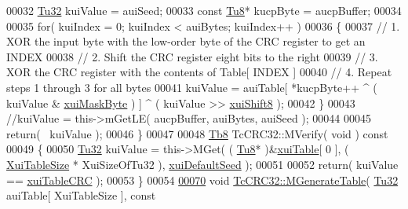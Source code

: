 \begin{DoxyCode}
00032    \mbox{\hyperlink{namespace_g_n_common_a941b527ef318f318aed7903dc832b7e4}{Tu32}}       kuiValue = auiSeed;
00033    \textcolor{keyword}{const} \mbox{\hyperlink{namespace_g_n_common_a7939e251ddbf5d3a31832dcfdc8bde39}{Tu8}}* kucpByte = aucpBuffer;
00034 
00035    \textcolor{keywordflow}{for}( kuiIndex = 0; kuiIndex < auiBytes; kuiIndex++ )
00036    \{
00037       \textcolor{comment}{// 1. XOR the input byte with the low-order byte of the CRC register to get an INDEX}
00038       \textcolor{comment}{// 2. Shift the CRC register eight bits to the right}
00039       \textcolor{comment}{// 3. XOR the CRC register with the contents of Table[ INDEX ]}
00040       \textcolor{comment}{// 4. Repeat steps 1 through 3 for all bytes}
00041       kuiValue = auiTable[ *kucpByte++ ^ ( kuiValue & \mbox{\hyperlink{class_g_n_common_1_1_n_data_authentication_1_1_tc_c_r_c32_ab156bd5eaab2fe267499870a8f6e4925}{xuiMaskByte}} ) ] ^ ( kuiValue >> 
      \mbox{\hyperlink{class_g_n_common_1_1_n_data_authentication_1_1_tc_c_r_c32_aae1c17e2c8f312d0bf2e062a5412ada8}{xuiShift8}} );
00042    \}
00043    \textcolor{comment}{//kuiValue = this->mGetLE( aucpBuffer, auiBytes, auiSeed );}
00044 
00045    \textcolor{keywordflow}{return}( ~kuiValue );
00046 \}
00047 
00048 \mbox{\hyperlink{namespace_g_n_common_a8115dc7ed53b6e5b52e6bfde1632ea74}{Tb8}} TcCRC32::MVerify( \textcolor{keywordtype}{void} )\textcolor{keyword}{ const}
00049 \textcolor{keyword}{}\{
00050    \mbox{\hyperlink{namespace_g_n_common_a941b527ef318f318aed7903dc832b7e4}{Tu32}} kuiValue = this->MGet( ( \mbox{\hyperlink{namespace_g_n_common_a7939e251ddbf5d3a31832dcfdc8bde39}{Tu8}}* )&\mbox{\hyperlink{class_g_n_common_1_1_n_data_authentication_1_1_tc_c_r_c32_a4aafd40037856d1bd4ea6f6ce0928836}{xuiTable}}[ 0 ], ( 
      \mbox{\hyperlink{class_g_n_common_1_1_n_data_authentication_1_1_tc_c_r_c32_a520aaabe0f4ade7f38afd480281b2180}{XuiTableSize}} * XuiSizeOfTu32 ), \mbox{\hyperlink{class_g_n_common_1_1_n_data_authentication_1_1_tc_c_r_c32_a07c2c3cd02a6f0eedc7a56565f7960c1}{xuiDefaultSeed}} );
00051 
00052    \textcolor{keywordflow}{return}( kuiValue == \mbox{\hyperlink{class_g_n_common_1_1_n_data_authentication_1_1_tc_c_r_c32_aafa160e99ae03386b426884450ba3796}{xuiTableCRC}} );
00053 \}
00054 
\mbox{\hyperlink{class_g_n_common_1_1_n_data_authentication_1_1_tc_c_r_c32_a11a20f9425a6431b0f2eb72e126a3a0e}{00070}} \textcolor{keywordtype}{void} \mbox{\hyperlink{class_g_n_common_1_1_n_data_authentication_1_1_tc_c_r_c32_a11a20f9425a6431b0f2eb72e126a3a0e}{TcCRC32::MGenerateTable}}( \mbox{\hyperlink{namespace_g_n_common_a941b527ef318f318aed7903dc832b7e4}{Tu32}} auiTable[ XuiTableSize ], \textcolor{keyword}{const} 

\end{DoxyCode}
